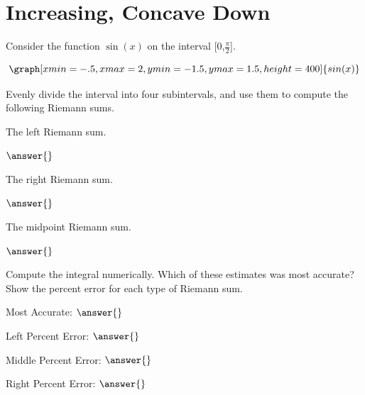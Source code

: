 \documentclass{ximera}
\begin{document}
\section{Increasing, Concave Down}
\begin{question}
Consider the function $\sin(x)$ on the interval [0,$\frac{\pi}{2}$].

\[
\graph[xmin=-.5,xmax=2,ymin=-1.5,ymax=1.5,height=400]{sin(x)}
\]

Evenly divide the interval into four subintervals, and use them to compute the following Riemann sums.

The left Riemann sum.

\begin{onlineOnly}
\begin{sageCell}

\end{sageCell}
\end{onlineOnly}

$\answer{}$

The right Riemann sum.

\begin{onlineOnly}
\begin{sageCell}

\end{sageCell}
\end{onlineOnly}

$\answer{}$

The midpoint Riemann sum.

\begin{onlineOnly}
\begin{sageCell}

\end{sageCell}
\end{onlineOnly}

$\answer{}$

Compute the integral numerically. Which of these estimates was most accurate? Show the percent error for each type of Riemann sum.

\begin{onlineOnly}
\begin{sageCell}

\end{sageCell}
\end{onlineOnly}

Most Accurate: $\answer{}$

Left Percent Error: $\answer{}$

Middle Percent Error: $\answer{}$

Right Percent Error: $\answer{}$
\end{question}
\end{document}
